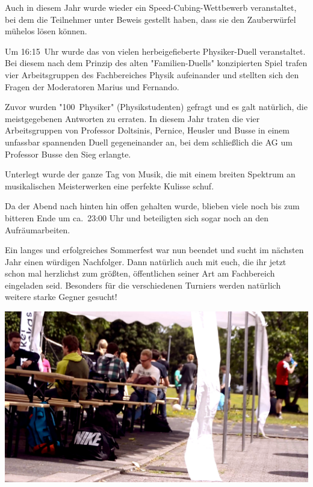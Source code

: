 \begin{multicols*}{2}
Auch in diesem Jahr wurde wieder ein Speed-Cubing-Wettbewerb veranstaltet, bei dem die Teilnehmer unter Beweis gestellt haben, dass sie den Zauberwürfel mühelos lösen können.

Um 16:15~Uhr wurde das von vielen herbeigefieberte Physiker-Duell veranstaltet.
Bei diesem nach dem Prinzip des alten "Familien-Duells" konzipierten Spiel trafen vier Arbeitsgruppen des Fachbereiches Physik aufeinander und stellten sich den Fragen der Moderatoren Marius und Fernando.

Zuvor wurden "100~Physiker" (Physikstudenten) gefragt und es galt natürlich, die meistgegebenen Antworten zu erraten.
In diesem Jahr traten die vier Arbeitsgruppen von Professor Doltsinis, Pernice, Heusler und Busse in einem unfassbar spannenden Duell gegeneinander an, bei dem schließlich die AG um Professor Busse den Sieg erlangte.

Unterlegt wurde der ganze Tag von Musik, die mit einem breiten Spektrum an musikalischen Meisterwerken eine perfekte Kulisse schuf.

Da der Abend nach hinten hin offen gehalten wurde, blieben viele noch bis zum bitteren Ende um ca.~23:00 Uhr und beteiligten sich sogar noch an den Aufräumarbeiten.

Ein langes und erfolgreiches Sommerfest war nun beendet und sucht im nächsten Jahr einen würdigen Nachfolger.
Dann natürlich auch mit euch, die ihr jetzt schon mal herzlichst zum größten, öffentlichen seiner Art am Fachbereich eingeladen seid.
Besonders für die verschiedenen Turniers werden natürlich weitere starke Gegner gesucht!


\medskip
\includegraphics[width=\columnwidth]{res/sommerfest_zelt.png}
\end{multicols*}
